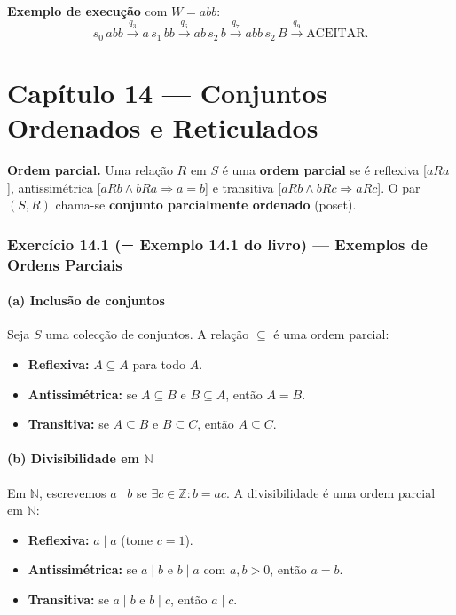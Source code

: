 \documentclass[12pt,a4paper]{article}
\newcommand{\keyword}[1]{\textbf{\textcolor{azul}{#1}}}
\begin{document}
\medskip
\noindent\textbf{Exemplo de execução} com $W = abb$:
\[
  s_0\,abb \xrightarrow{q_3} a\,s_1\,bb \xrightarrow{q_6} ab\,s_2\,b
  \xrightarrow{q_7} abb\,s_2\,B \xrightarrow{q_9} \text{ACEITAR.}
\]

\newpage
\part*{Capítulo 14 — Conjuntos Ordenados e Reticulados}

\begin{teoriacaixa}
\textbf{Ordem parcial.} Uma relação $R$ em $S$ é uma \keyword{ordem parcial} se é
reflexiva [$aRa$], antissimétrica [$aRb \wedge bRa \Rightarrow a = b$] e transitiva
[$aRb \wedge bRc \Rightarrow aRc$]. O par $(S,R)$ chama-se \keyword{conjunto parcialmente
ordenado} (poset).
\end{teoriacaixa}

\section*{Exercício 14.1 (= Exemplo 14.1 do livro) — Exemplos de Ordens Parciais}

\subsection*{(a) Inclusão de conjuntos}

Seja $S$ uma colecção de conjuntos. A relação $\subseteq$ é uma ordem parcial:
\begin{itemize}
  \item \textbf{Reflexiva:} $A \subseteq A$ para todo $A$.
  \item \textbf{Antissimétrica:} se $A \subseteq B$ e $B \subseteq A$, então $A = B$.
  \item \textbf{Transitiva:} se $A \subseteq B$ e $B \subseteq C$, então $A \subseteq C$.
\end{itemize}

\subsection*{(b) Divisibilidade em $\mathbb{N}$}

Em $\mathbb{N}$, escrevemos $a \mid b$ se $\exists c \in \mathbb{Z}: b = ac$.
A divisibilidade é uma ordem parcial em $\mathbb{N}$:
\begin{itemize}
  \item \textbf{Reflexiva:} $a \mid a$ (tome $c = 1$).
  \item \textbf{Antissimétrica:} se $a \mid b$ e $b \mid a$ com $a,b > 0$, então $a = b$.
  \item \textbf{Transitiva:} se $a \mid b$ e $b \mid c$, então $a \mid c$.
\end{itemize}
\end{document}
